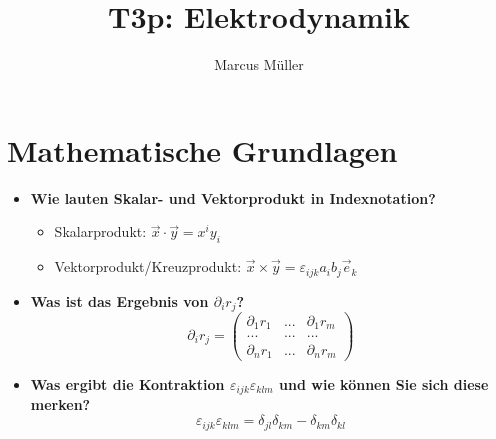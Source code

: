 \documentclass[german]{latex4ei/latex4ei_sheet}
\title{T3p: Elektrodynamik}
\author{Marcus Müller}
\begin{document}
\ifdefined\GitRevision{}\fi

\maketitle
\section{Mathematische Grundlagen}

\begin{sectionbox}
	\begin{itemize}
		\item \textbf{Wie lauten Skalar- und Vektorprodukt in Indexnotation?} 
		\begin{itemize}
			\item Skalarprodukt: $\vec{x}\cdot\vec{y}=x^iy_i$ 
			\item Vektorprodukt/Kreuzprodukt: $\vec{x}\times\vec{y}=\varepsilon_{ijk}a_ib_j\vec{e}_k$
		\end{itemize}
		\item \textbf{Was ist das Ergebnis von $\partial_ir_j$?}
		\begin{equation}
			\partial_ir_j=\left(
			\begin{matrix}
  				\partial_1r_1 & ... &\partial_1r_m \\
 				... &... & ...\\
 				\partial_nr_1 &... & \partial_nr_m
			\end{matrix}\right)
		\end{equation}
		\item \textbf{Was ergibt die Kontraktion $\varepsilon_{ijk}\varepsilon_{klm}$ und wie können Sie sich diese merken?}
		\begin{equation}
			\varepsilon_{ijk}\varepsilon_{klm}=\delta_{jl}\delta_{km}-\delta_{km}\delta_{kl}
		\end{equation}
		

\end{itemize}
\end{sectionbox}
\end{document}
